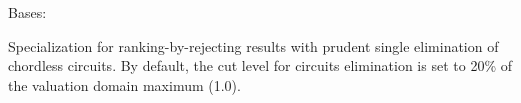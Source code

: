 \documentclass[letterpaper,10pt,english]{sphinxmanual}
\begin{document}
\begin{fulllineitems}
\label{techDoc:weakOrders.RankingByPrudentChoosingDigraph}
Bases: {\hyperref[techDoc:weakOrders.RankingByChoosingDigraph]{}}

Specialization for ranking-by-rejecting results with prudent single elimination of chordless circuits. By default, the cut level for circuits elimination is set to 20\% of the valuation domain maximum (1.0).

\end{fulllineitems}

\end{document}
